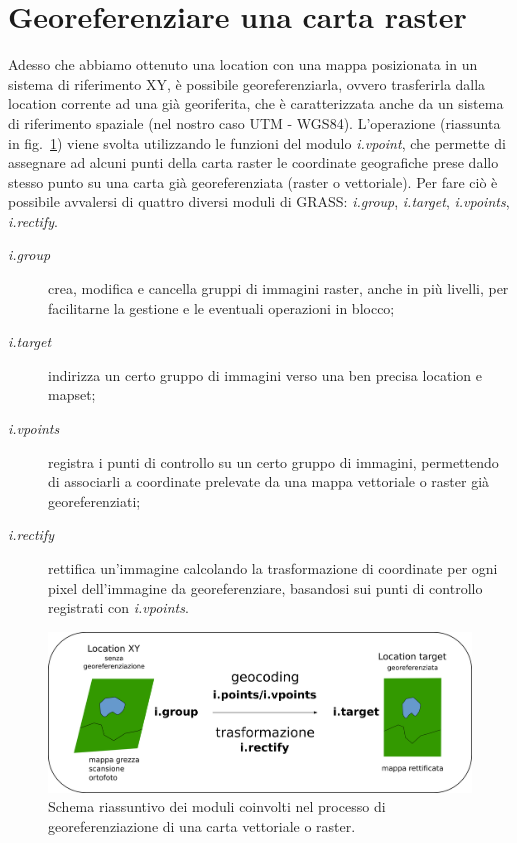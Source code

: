 \section{\label{sec:Georeferenziare-una-carta-raster}Georeferenziare una carta raster}
	Adesso che abbiamo ottenuto una location con una mappa posizionata in un sistema di riferimento XY, è possibile georeferenziarla, ovvero trasferirla dalla location corrente ad una già georiferita, che è caratterizzata anche da un sistema di riferimento spaziale (nel nostro caso UTM - WGS84). L'operazione (riassunta in fig.~\ref{fig:georef}) viene svolta utilizzando le funzioni del modulo \emph{i.vpoint}, che permette di assegnare ad alcuni punti della carta raster le coordinate geografiche prese dallo stesso punto su una carta già georeferenziata (raster o vettoriale). Per fare ciò è possibile avvalersi di quattro diversi moduli di GRASS: \emph{i.group}, \emph{i.target}, \emph{i.vpoints}, \emph{i.rectify}.
	
	\begin{description}
		\item [{\emph{i.group}}] crea, modifica e cancella gruppi di immagini raster, anche in più livelli, per facilitarne la gestione e le eventuali operazioni in blocco;
		\item [{\emph{i.target}}] indirizza un certo gruppo di immagini verso una ben precisa location e mapset;
		\item [{\emph{i.vpoints}}] registra i punti di controllo su un certo gruppo di immagini, permettendo di associarli a coordinate prelevate da una mappa vettoriale o raster già georeferenziati;
		\item [{\emph{i.rectify}}] rettifica un'immagine calcolando la trasformazione di coordinate per ogni pixel dell'immagine da georeferenziare, basandosi sui punti di controllo registrati con \emph{i.vpoints}.
	\end{description}

	\begin{figure}
		\centering
		\includegraphics[scale=0.35]{img/g4556}
		\caption{{\small \label{fig:georef}Schema riassuntivo dei moduli coinvolti nel processo di georeferenziazione di una carta vettoriale o raster.}}
	\end{figure}

